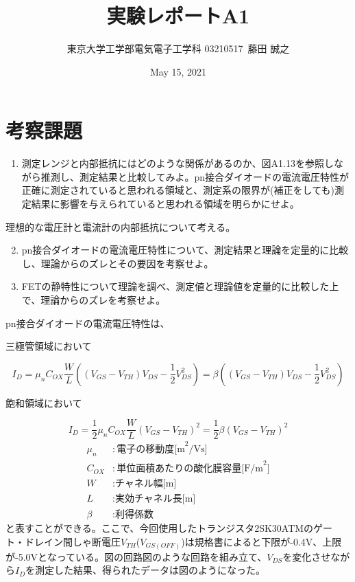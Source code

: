 \documentclass[a4j,dvipdfmx]{article}
\title{実験レポートA1}
\author{東京大学工学部電気電子工学科 03210517\ 藤田 誠之 }
\date{May 15, 2021}
\begin{document}

\maketitle

\section{考察課題}

\begin{enumerate}[label={(\arabic*)}]
  \item 測定レンジと内部抵抗にはどのような関係があるのか、図A1.13を参照しながら推測し、測定結果と比較してみよ。pn接合ダイオードの電流電圧特性が正確に測定されていると思われる領域と、測定系の限界が(補正をしても)測定結果に影響を与えられていると思われる領域を明らかにせよ。
\end{enumerate}
理想的な電圧計と電流計の内部抵抗について考える。


\begin{enumerate}[label={(\arabic*)}]
    \setcounter{enumi}{1}
    \item pn接合ダイオードの電流電圧特性について、測定結果と理論を定量的に比較し、理論からのズレとその要因を考察せよ。
\end{enumerate}

\begin{enumerate}[label={(\arabic*)}]
  \setcounter{enumi}{2}
  \item FETの静特性について理論を調べ、測定値と理論値を定量的に比較した上で、理論からのズレを考察せよ。
\end{enumerate}

pn接合ダイオードの電流電圧特性は、\\
\begin{center}
  三極管領域において
\end{center}
$$
I_D = \mu_nC_{OX}\frac{W}{L}\left((V_{GS}-V_{TH})V_{DS} - \frac{1}{2}V_{DS}^2\right) = \beta\left((V_{GS}-V_{TH})V_{DS} - \frac{1}{2}V_{DS}^2\right)
$$
\begin{center}
    飽和領域において
\end{center}
$$
I_D = \frac{1}{2}\mu_nC_{OX}\frac{W}{L}\left(V_{GS}-V_{TH}\right)^2 = \frac{1}{2}\beta(V_{GS}-V_{TH})^2
$$
\begin{align}
  \mu_n &: \mbox{電子の移動度[m}^2\mbox{/Vs]}\nonumber \\
  C_{OX} &: \mbox{単位面積あたりの酸化膜容量[F/m}^2\mbox{]} \nonumber \\
  W &: \mbox{チャネル幅[m]} \nonumber \\
  L &: \mbox{実効チャネル長[m]} \nonumber \\
  \beta &: \mbox{利得係数} \nonumber
\end{align}
と表すことができる。ここで、今回使用したトランジスタ2SK30ATMのゲート・ドレイン間しゃ断電圧$V_{TH}$($V_{GS(OFF)}$)は規格書によると下限が-0.4V、上限が-5.0Vとなっている。図の回路図のような回路を組み立て、$V_{DS}$を変化させながら$I_D$を測定した結果、得られたデータは図のようになった。
\end{document}
